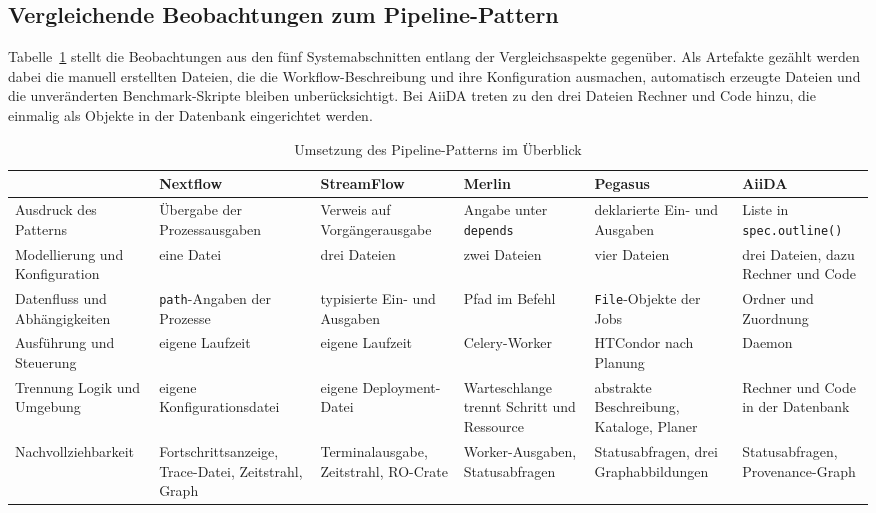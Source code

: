 \subsection{Vergleichende Beobachtungen zum Pipeline-Pattern}
\label{sec:lokal:pipeline:zusammenfassung}

Tabelle~\ref{tab:pipe:vergleich} stellt die Beobachtungen aus den
fünf Systemabschnitten entlang der Vergleichsaspekte gegenüber. Als
Artefakte gezählt werden dabei die manuell erstellten Dateien, die
die Workflow-Beschreibung und ihre Konfiguration ausmachen,
automatisch erzeugte Dateien und die unveränderten Benchmark-Skripte
bleiben unberücksichtigt. Bei AiiDA treten zu den drei Dateien
Rechner und Code hinzu, die einmalig als Objekte in der Datenbank
eingerichtet werden.

\begin{table}[H]
  \caption{Umsetzung des Pipeline-Patterns im Überblick}
  \label{tab:pipe:vergleich}
  \centering
  \scriptsize
  \setlength{\tabcolsep}{3pt}
  \renewcommand{\arraystretch}{1.4}
  \begin{tabular}{>{\raggedright\arraybackslash}p{2.7cm} >{\raggedright\arraybackslash}p{1.9cm} >{\raggedright\arraybackslash}p{1.9cm} >{\raggedright\arraybackslash}p{1.9cm} >{\raggedright\arraybackslash}p{1.9cm} >{\raggedright\arraybackslash}p{1.9cm}}
    \hline
     & \textbf{Nextflow} & \textbf{Stream\-Flow} & \textbf{Merlin} & \textbf{Pegasus} & \textbf{AiiDA} \\
    \hline
    Ausdruck des Patterns & Übergabe der Prozess\-ausgaben & Verweis auf Vorgänger\-ausgabe & Angabe unter \texttt{depends} & deklarierte Ein- und Ausgaben & Liste in \texttt{spec.outline()} \\
    Modellierung und Konfiguration & eine Datei & drei Dateien & zwei Dateien & vier Dateien & drei Dateien, dazu Rechner und Code \\
    Datenfluss und Abhängigkeiten & \texttt{path}-Angaben der Prozesse & typisierte Ein- und Ausgaben & Pfad im Befehl & \texttt{File}-Objekte der Jobs & Ordner und Zuordnung \\
    Ausführung und Steuerung & eigene Laufzeit & eigene Laufzeit & Celery-Worker & HTCondor nach Planung & Daemon \\
    Trennung Logik und Umgebung & eigene Konfigu\-rationsdatei & eigene Deployment-Datei & Warteschlange trennt Schritt und Ressource & abstrakte Beschreibung, Kataloge, Planer & Rechner und Code in der Datenbank \\
    Nachvollziehbarkeit & Fortschritts\-anzeige, Trace-Datei, Zeitstrahl, Graph & Terminal\-ausgabe, Zeitstrahl, RO-Crate & Worker-Ausgaben, Status\-abfragen & Status\-abfragen, drei Graph\-abbildungen & Status\-abfragen, Provenance-Graph \\
    \hline
  \end{tabular}
\end{table}

